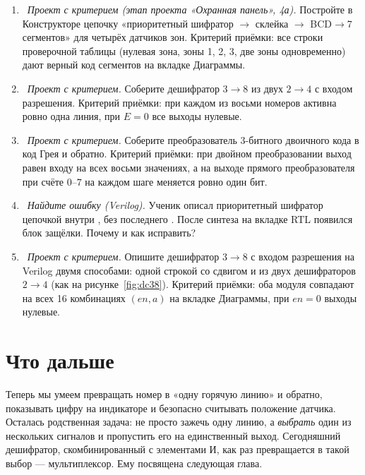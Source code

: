 \begin{taskbox}
\begin{enumerate}
  \item {}~\emph{Проект с критерием (этап проекта «Охранная панель», 4а).} Постройте в Конструкторе цепочку «приоритетный шифратор $\to$ склейка $\to$ BCD$\to$7 сегментов» для четырёх датчиков зон. Критерий приёмки: все строки проверочной таблицы (нулевая зона, зоны 1, 2, 3, две зоны одновременно) дают верный код сегментов на вкладке Диаграммы.
  \item {}~\emph{Проект с критерием.} Соберите дешифратор $3\to8$ из двух $2\to4$ с входом разрешения. Критерий приёмки: при каждом из восьми номеров активна ровно одна линия, при $E=0$ все выходы нулевые.
  \item {}~\emph{Проект с критерием.} Соберите преобразователь $3$-битного двоичного кода в код Грея и обратно. Критерий приёмки: при двойном преобразовании выход равен входу на всех восьми значениях, а на выходе прямого преобразователя при счёте $0$--$7$ на каждом шаге меняется ровно один бит.
  \item {}~\emph{Найдите ошибку (Verilog).} Ученик описал приоритетный шифратор цепочкой  внутри , без последнего . После синтеза на вкладке RTL появился блок защёлки. Почему и как исправить?
  \item {}~\emph{Проект с критерием.} Опишите дешифратор $3\to8$ с входом разрешения на Verilog двумя способами: одной строкой со сдвигом и из двух дешифраторов $2\to4$ (как на рисунке~\ref{fig:dc38}). Критерий приёмки: оба модуля совпадают на всех 16 комбинациях $(en,a)$ на вкладке Диаграммы, при $en=0$ выходы нулевые.
\end{enumerate}
\end{taskbox}

\section{Что дальше}

Теперь мы умеем превращать номер в «одну горячую линию» и обратно, показывать
цифру на индикаторе и безопасно считывать положение датчика. Осталась
родственная задача: не просто зажечь одну линию, а \emph{выбрать} один из
нескольких сигналов и пропустить его на единственный выход. Сегодняшний
дешифратор, скомбинированный с элементами И, как раз превращается в такой
выбор --- мультиплексор. Ему посвящена следующая глава.

